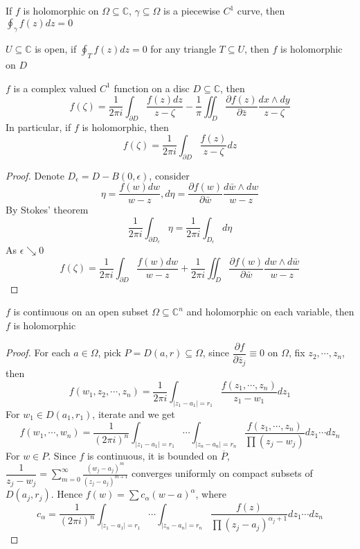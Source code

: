 \documentclass[main]{subfiles}
\begin{document}
\begin{theorem}
If $f$ is holomorphic on $\Omega\subseteq\mathbb C$, $\gamma\subseteq\Omega$ is a piecewise $C^1$ curve, then $\displaystyle\oint_\gamma f(z)dz=0$
\end{theorem}

\begin{theorem}
$U\subseteq\mathbb C$ is open, if $\displaystyle\oint_Tf(z)dz=0$ for any triangle $T\subseteq U$, then $f$ is holomorphic on $D$
\end{theorem}

\begin{theorem}\label{Cauchy-Pompeiu formula}
$f$ is a complex valued $C^1$ function on a disc $D\subseteq \mathbb C$, then
\[f(\zeta)=\frac{1}{2\pi i}\int_{\partial D}\frac{f(z)dz}{z-\zeta}-\frac{1}{\pi}\iint_{D}\frac{\partial f(z)}{\partial\bar z}\frac{dx\wedge dy}{z-\zeta}\]
In particular, if $f$ is holomorphic, then
\[f(\zeta)=\frac{1}{2\pi i}\int_{\partial D}\frac{f(z)}{z-\zeta}dz\]
\end{theorem}

\begin{proof}
Denote $D_\epsilon=D-B(0,\epsilon)$, consider 
\[\eta=\dfrac{f(w)dw}{w-z}, d\eta=\frac{\partial f(w)}{\partial\bar w}\frac{d\bar w\wedge dw}{w-z}\]
By Stokes' theorem
\[\dfrac{1}{2\pi i}\int_{\partial D_\epsilon}\eta=\dfrac{1}{2\pi i}\int_{D_\epsilon}d\eta\]
As $\epsilon\searrow 0$
\[f(\zeta)=\frac{1}{2\pi i}\int_{\partial D}\frac{f(w)dw}{w-z}+\frac{1}{2\pi i}\iint_{D}\frac{\partial f(w)}{\partial\bar w}\frac{dw\wedge d\bar w}{w-z}\]
\end{proof}

\begin{lemma}\label{Osgood's lemma}
$f$ is continuous on an open subset $\Omega\subseteq\mathbb C^n$ and holomorphic on each variable, then $f$ is holomorphic
\end{lemma}

\begin{proof}
For each $a\in\Omega$, pick $P=D(a,r)\subseteq\Omega$, since $\dfrac{\partial f}{\partial \bar z_j}\equiv0$ on $\Omega$, fix $z_2,\cdots, z_n$, then
\[f(w_1,z_2,\cdots,z_n)=\frac{1}{2\pi i}\int_{|z_1-a_1|=r_1}\frac{f(z_1,\cdots,z_n)}{z_1-w_1}dz_1\]
For $w_1\in D(a_1,r_1)$, iterate and we get
\[f(w_1,\cdots,w_n)=\frac{1}{(2\pi i)^n}\int_{|z_1-a_1|=r_1}\cdots\int_{|z_n-a_n|=r_n}\frac{f(z_1,\cdots,z_n)}{\prod(z_j-w_j)}dz_1\cdots dz_n\]
For $w\in P$. Since $f$ is continuous, it is bounded on $\overline P$, $\displaystyle\dfrac{1}{z_j-w_j}=\sum_{m=0}^\infty\frac{(w_j-a_j)^m}{(z_j-a_j)^{m+1}}$ converges uniformly on compact subsets of $D(a_j,r_j)$. Hence $f(w)=\sum c_\alpha(w-a)^\alpha$, where
\[c_\alpha=\frac{1}{(2\pi i)^n}\int_{|z_1-a_1|=r_1}\cdots\int_{|z_n-a_n|=r_n}\frac{f(z)}{\prod(z_j-a_j)^{\alpha_j+1}}dz_1\cdots dz_n\]
\end{proof}
\end{document}
